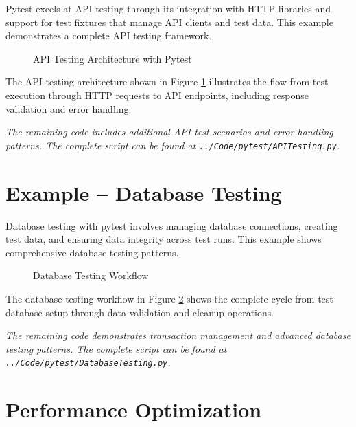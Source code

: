 Pytest excels at API testing through its integration with HTTP libraries and support for test fixtures that manage API clients and test data. This example demonstrates a complete API testing framework.

\begin{figure}[htbp]
	\centering
    
	\caption{API Testing Architecture with Pytest}
	\label{fig:api_testing}
\end{figure}

The API testing architecture shown in Figure \ref{fig:api_testing} illustrates the flow from test execution through HTTP requests to API endpoints, including response validation and error handling.


\noindent\textit{The remaining code includes additional API test scenarios and error handling patterns. The complete script can be found at \texttt{../Code/pytest/APITesting.py}.}

\section{Example -- Database Testing}
\label{sec:database_example}

Database testing with pytest involves managing database connections, creating test data, and ensuring data integrity across test runs. This example shows comprehensive database testing patterns.

\begin{figure}[htbp]
	\centering
    
	\caption{Database Testing Workflow}
	\label{fig:database_testing}
\end{figure}

The database testing workflow in Figure \ref{fig:database_testing} shows the complete cycle from test database setup through data validation and cleanup operations.


\noindent\textit{The remaining code demonstrates transaction management and advanced database testing patterns. The complete script can be found at \texttt{../Code/pytest/DatabaseTesting.py}.}

\section{Performance Optimization}
\label{sec:optimization}

